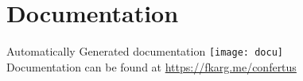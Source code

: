 \section{Documentation}
\begin{frame}[c]{Automatically Generated documentation}
    \centering
    \texttt{[image: docu]} \\
    Documentation can be found at \url{https://fkarg.me/confertus}
\end{frame}
